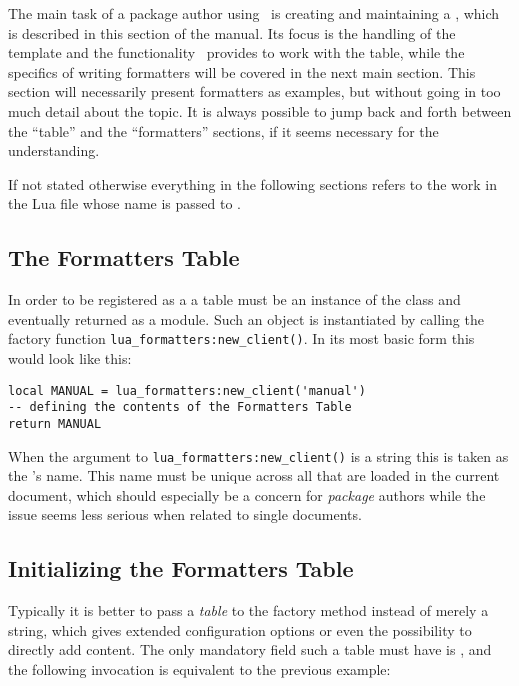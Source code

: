 \documentclass[12pt]{scrartcl}
\begin{document}
The main task of a package author using \luaformatters\ is creating and
maintaining a , which is described in this section of the
manual.  Its focus is the handling of the template and the functionality
\luaformatters\ provides to work with the table, while the specifics of
writing formatters will be covered in the next main section.  This section will
necessarily present formatters as examples, but without going in too much detail
about the topic.  It is always possible to jump back and forth between the
“table” and the “formatters” sections, if it seems necessary for the
understanding.

If not stated otherwise everything in the following sections refers to the work
in the Lua file whose name is passed to \texttt{\addLuaFormatters{}}.

\subsection{The Formatters Table}
\label{sec:usage:templates-table}

In order to be registered as a  a table must be an instance of the
 class and eventually returned as a module.  Such an object is instantiated by calling the factory
function \texttt{lua_formatters:new_client()}.  In its most basic form this would look like this:

\begin{verbatim}
local MANUAL = lua_formatters:new_client('manual')
-- defining the contents of the Formatters Table
return MANUAL
\end{verbatim}

\noindent When the argument to \texttt{lua_formatters:new_client()} is a string
this is taken as the 's name.  This name must be unique
across all  that are loaded in the current document, which
should especially be a concern for \emph{package} authors while the issue seems
less serious when related to single documents.


\subsection{Initializing the Formatters Table}
\label{sec:usage:initializing-the-template-table}

Typically it is better to pass a \emph{table} to the factory method instead of
merely a string, which gives extended configuration options or even the
possibility to directly add content. The only mandatory field such a table must
have is , and the following invocation is equivalent to the
previous example:
\end{document}
